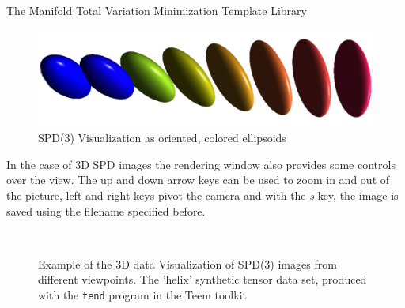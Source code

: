 \begin{chapter}{The Manifold Total Variation Minimization Template Library}
\begin{figure}[h!]
        \centering
	    \includegraphics[width=0.8\linewidth]{./figures/library/ellipsoids.pdf}
	    \caption[SPD(3) ellipsoid visualization]{SPD(3) Visualization as oriented, colored ellipsoids}
	\label{fig:ellipsoid_visualization}
\end{figure}

In the case of 3D SPD images the rendering window also provides some controls over the view. The up and down arrow keys can be used to zoom in and out of the picture, left and right keys
pivot the camera and with the \emph{s} key, the image is saved using the filename specified before.
\begin{figure}[h!]
    \centering
    \\
    \caption[3D SPD(3) Volume Visualization of a helix]{Example of the 3D data Visualization of SPD(3) images from different viewpoints. The 'helix' synthetic tensor data set, produced with the \texttt{tend} program in the Teem toolkit\cite{teem}
	\label{fig:helix}
    }
\end{figure}


\end{chapter}

